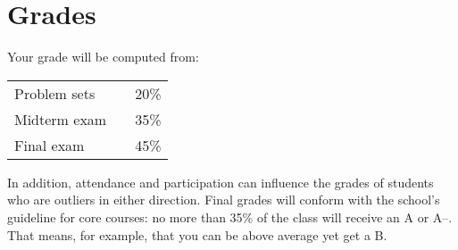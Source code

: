 \documentclass[12pt]{article}
\begin{document}
\section{Grades}

Your grade will be computed from:
%
\begin{center}
\begin{tabular}{lcc}
    Problem sets   &&  20\% \\
    Midterm exam   &&  35\% \\
    Final exam     &&  45\%
\end{tabular}
\end{center}
%
In addition, attendance and participation can influence
the grades of students who are outliers in either direction.
Final grades will conform with the school's guideline for core courses:
no more than 35\% of the class will receive an A or A--.
That means, for example, that you can be above average yet get a B.
\end{document}
